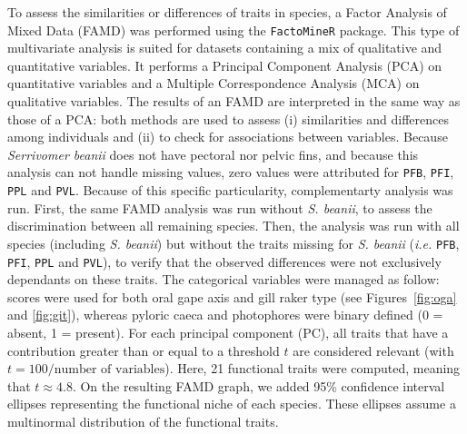 To assess the similarities or differences of traits in species, a Factor Analysis of Mixed Data (FAMD) was performed using the \texttt{FactoMineR} package. This type of multivariate analysis is suited for datasets containing a mix of qualitative and quantitative variables. It performs a Principal Component Analysis (PCA) on quantitative variables and a Multiple Correspondence Analysis (MCA) on qualitative variables. The results of an FAMD are interpreted in the same way as those of a PCA: both methods are used to assess (i) similarities and differences among individuals and (ii) to check for associations between variables. Because \textit{Serrivomer beanii} does not have pectoral nor pelvic fins, and because this analysis can not handle missing values, zero values were attributed for \texttt{PFB}, \texttt{PFI}, \texttt{PPL} and \texttt{PVL}. Because of this specific particularity, complementarty analysis was run. First, the same FAMD analysis was run without \textit{S. beanii}, to assess the discrimination between all remaining species. Then, the analysis was run with all species (including \emph{S. beanii}) but without the traits missing for \emph{S. beanii} (\emph{i.e.} \texttt{PFB}, \texttt{PFI}, \texttt{PPL} and \texttt{PVL}), to verify that the observed differences were not exclusively dependants on these traits. The categorical variables were managed as follow: scores were used for both oral gape axis and gill raker type (see Figures~\ref{fig:oga} and \ref{fig:git}), whereas pyloric caeca and photophores were binary defined (0 = absent, 1 = present). For each principal component (PC), all traits that have a contribution greater than or equal to a threshold $t$ are considered relevant (with $t = 100 / \text{number of variables}$). Here, 21 functional traits were computed, meaning that $t \approx 4.8$. On the resulting FAMD graph, we added 95\% confidence interval ellipses representing the functional niche of each species. These ellipses assume a multinormal distribution of the functional traits.

